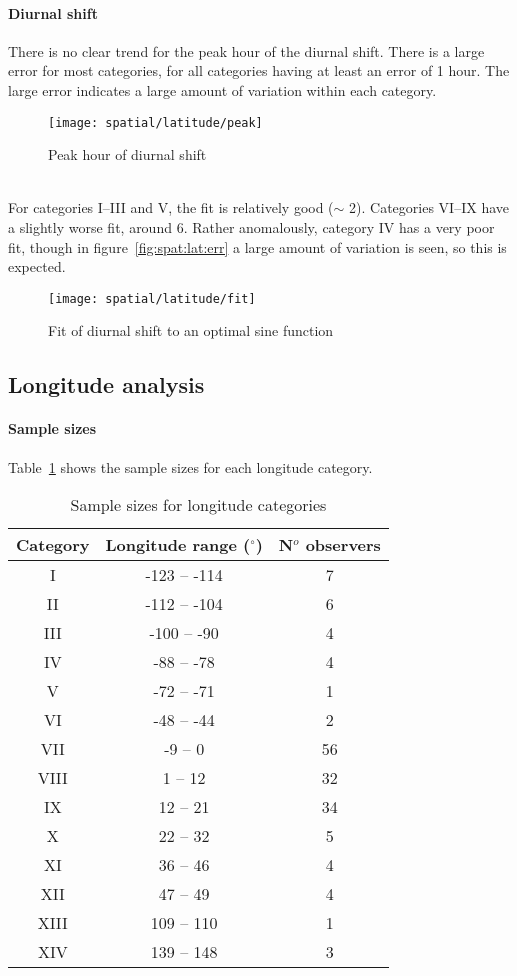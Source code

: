 \paragraph{Diurnal shift\\}
There is no clear trend for the peak hour of the diurnal shift. There is a large error for most categories, for all categories having at least an error of 1 hour. The large error indicates a large amount of variation within each category.
\begin{figure}[h!]
	\centering
	\texttt{[image: spatial/latitude/peak]}
	\caption{Peak hour of diurnal shift
		\label{fig:spat:lat:peak}}
\end{figure}\\
For categories I--III and V, the fit is relatively good (${\sim}$ 2). Categories VI--IX have a slightly worse fit, around 6. Rather anomalously, category IV has a very poor fit, though in figure~\ref{fig:spat:lat:err} a large amount of variation is seen, so this is expected.
\begin{figure}[h!]
	\centering
	\texttt{[image: spatial/latitude/fit]}
	\caption{Fit of diurnal shift to an optimal sine function
		\label{fig:spat:lat:fit}}
\end{figure}

\subsection{Longitude analysis}

\paragraph{Sample sizes\\}
Table~\ref{tab:spat:long} shows the sample sizes for each longitude category.
\begin{table}[h!]
	\centering
\begin{tabular}{ccc}
	\hline 
	Category & Longitude range ($^{\circ}$) & N$^o$ observers \\ 
	\hline 
	I & -123 -- -114 & 7 \\ 
	II & -112 -- -104 & 6 \\ 
	III & -100 -- -90 & 4 \\ 
	IV & -88 -- -78 & 4 \\ 
	V & -72 -- -71 & 1 \\ 
	VI & -48 -- -44 & 2 \\ 
	VII & -9 -- 0 & 56 \\ 
	VIII & 1 -- 12 & 32 \\ 
	IX & 12 -- 21 & 34 \\ 
	X & 22 -- 32 & 5 \\ 
	XI & 36 -- 46 & 4 \\ 
	XII & 47 -- 49 & 4 \\  
	XIII & 109 -- 110 & 1 \\ 
	XIV & 139 -- 148 & 3 \\  
	\hline
\end{tabular} 
\caption{Sample sizes for longitude categories \label{tab:spat:long}}
\end{table}

